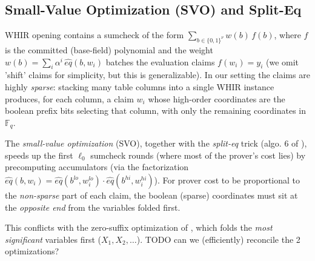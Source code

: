 \documentclass{article}
\theoremstyle{definition}
\newcommand{\Fq}{\mathbb F_q}
\begin{document}
\subsection{Small-Value Optimization (SVO) and Split-Eq}\label{sec:svo}

WHIR opening contains a sumcheck of the form $\sum_{b \in \{0,1\}^\nu} w(b)\, f(b)$, where $f$ is the committed (base-field) polynomial and the weight $w(b) = \sum_i \alpha^i\, \hat{eq}(b, w_i)$ batches the evaluation claims $f(w_i) = y_i$ (we omit 'shift' claims for simplicity, but this is generalizable). In our setting the claims are highly \emph{sparse}: stacking many table columns into a single WHIR instance produces, for each column, a claim $w_i$ whose high-order coordinates are the boolean prefix bits selecting that column, with only the remaining coordinates in $\Fq$.

The \emph{small-value optimization} (SVO), together with the \emph{split-eq} trick (algo. 6 of \cite{Speeding-Up-Sum-Check-Proving}), speeds up the first $\ell_0$  sumcheck rounds (where most of the prover's cost lies) by precomputing accumulators (via the factorization $\hat{eq}(b, w_i) = \hat{eq}(b^{lo}, w_i^{lo}) \cdot \hat{eq}(b^{hi}, w_i^{hi})$). For prover cost to be proportional to the \emph{non-sparse} part of each claim, the boolean (sparse) coordinates must sit at the \emph{opposite end} from the variables folded first.

This conflicts with the zero-suffix optimization of , which folds the \emph{most significant} variables first ($X_1, X_2, \dots$). TODO can we (efficiently) reconcile the 2 optimizations?

\clearpage


\end{document}
